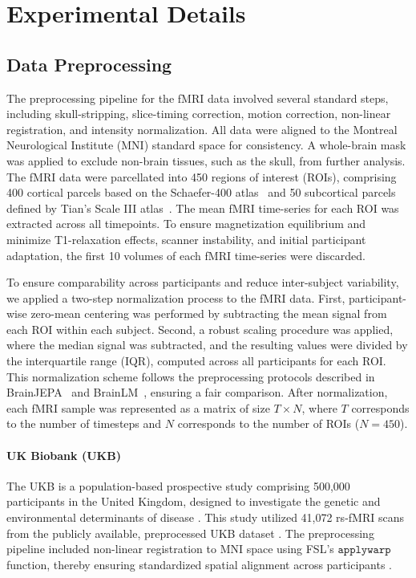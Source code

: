 \section{Experimental Details}
\label{sec:app:details}

\subsection{Data Preprocessing}
\label{sec:app:data_preprocessing}


The preprocessing pipeline for the fMRI data involved several standard steps, including skull-stripping, slice-timing correction, motion correction, non-linear registration, and intensity normalization. All data were aligned to the Montreal Neurological Institute (MNI) standard space for consistency. A whole-brain mask was applied to exclude non-brain tissues, such as the skull, from further analysis. The fMRI data were parcellated into 450 regions of interest (ROIs), comprising 400 cortical parcels based on the Schaefer-400 atlas~\cite{10.1093/cercor/bhx179} and 50 subcortical parcels defined by Tian’s Scale III atlas~\cite{Tian2020}. The mean fMRI time-series for each ROI was extracted across all timepoints. To ensure magnetization equilibrium and minimize T1-relaxation effects, scanner instability, and initial participant adaptation, the first 10 volumes of each fMRI time-series were discarded.

To ensure comparability across participants and reduce inter-subject variability, we applied a two-step normalization process to the fMRI data. First, participant-wise zero-mean centering was performed by subtracting the mean signal from each ROI within each subject. Second, a robust scaling procedure was applied, where the median signal was subtracted, and the resulting values were divided by the interquartile range (IQR), computed across all participants for each ROI. This normalization scheme follows the preprocessing protocols described in BrainJEPA~\citep{dong2024brain} and BrainLM~\citep{caro2024brainlm}, ensuring a fair comparison. After normalization, each fMRI sample was represented as a matrix of size $T \times N$, where $T$ corresponds to the number of timesteps and $N$ corresponds to the number of ROIs ($N = 450$). 


\label{sec:dataset_specific}

\paragraph{UK Biobank (UKB)}
\label{sec:ukb}
The UKB is a population-based prospective study comprising 500,000 participants in the United Kingdom, designed to investigate the genetic and environmental determinants of disease \cite{sudlow2015uk}. This study utilized 41,072 rs-fMRI scans from the publicly available, preprocessed UKB dataset \cite{alfaro2018image}. The preprocessing pipeline included non-linear registration to MNI space using FSL’s $\texttt{applywarp}$ function, thereby ensuring standardized spatial alignment across participants \cite{jenkinson2012fsl}.

